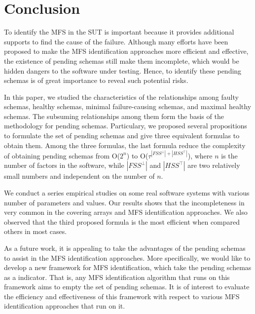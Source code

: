 {\section{Conclusion}\label{sec:conclusion}
To identify the MFS in the SUT is important because it provides additional supports to find the cause of the failure. Although many efforts have been proposed to make the MFS identification approaches more efficient and effective, the existence of pending schemas still make them incomplete, which would be hidden dangers to the software under testing. Hence, to identify these pending schemas is of great importance to reveal such potential risks.

In this paper, we studied the characteristics of the relationships among faulty schemas, healthy schemas, minimal failure-causing schemas, and maximal healthy schemas. The subsuming relationships among them form the basis of the methodology for pending schemas. Particulary, we proposed several propositions to formulate the set of pending schemas and give three equivalent formulas to obtain them. Among the three formulas, the last formula reduce the complexity of obtaining pending schemas from O($2^{n}$) to O($ \tau^{|FSS^{\bot}|+|HSS^{\top}|}$), where $n$ is the number of factors in the software, while $|FSS^{\bot}|$ and $|HSS^{\top}|$ are two relatively small numbers and independent on the number of $n$.

We conduct a series empirical studies on some real software systems with various number of parameters and values. Our results shows that the incompleteness in very common in the covering arrays and MFS identification approaches. We also observed that the third proposed formula is the most efficient when compared others in most cases.

As a future work, it is appealing to take the advantages of the pending schemas to assist in the MFS identification approaches. More specifically, we would like to develop a new framework for MFS identification, which take the pending schemas as a indicator. That is, any MFS identification algorithm that runs on this framework aims to empty the set of pending schemas. It is of interest to evaluate the efficiency and effectiveness of this framework with respect to various MFS identification approaches that run on it.

}
